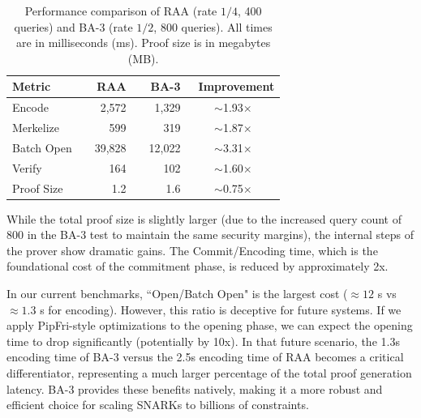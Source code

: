 \begin{table}[h]\vspace{-0.3cm}
\centering
\begin{tabular}{|l|rrc|}
\hline
\textbf{Metric} & \textbf{RAA} & \textbf{BA-3} &\  \textbf{Improvement} \\
\hline
Encode      & 2,572 & 1,329 & $\sim$1.93$\times$ \\
Merkelize   & 599  & 319  & $\sim$1.87$\times$ \\
Batch Open  &\ \  39,828 &\ \  12,022 & $\sim$3.31$\times$ \\
Verify      & 164     & 102     & $\sim$1.60$\times$ \\
Proof Size  & 1.2     & 1.6     & $\sim$0.75$\times$ \\
\hline
\end{tabular}
\caption{
Performance comparison of RAA (rate $1/4$, 400 queries) and BA-3 (rate $1/2$, 800 queries).
All times are in milliseconds (ms). Proof size is in megabytes (MB).
}\vspace{-0.4cm}
\end{table}

While the total proof size is slightly larger (due to the increased query count of 800 in the BA-3 test to maintain the same security margins), the internal steps of the prover show dramatic gains. The Commit/Encoding time, which is the foundational cost of the commitment phase, is reduced by approximately 2x.

In our current benchmarks, ``Open/Batch Open" is the largest cost ($\approx12$ s vs $\approx1.3$ s for encoding). However, this ratio is deceptive for future systems. If we apply PipFri-style optimizations to the opening phase, we can expect the opening time to drop significantly (potentially by 10x). In that future scenario, the 1.3s encoding time of BA-3 versus the 2.5s encoding time of RAA becomes a critical differentiator, representing a much larger percentage of the total proof generation latency. BA-3 provides these benefits natively, making it a more robust and efficient choice for scaling SNARKs to billions of constraints.